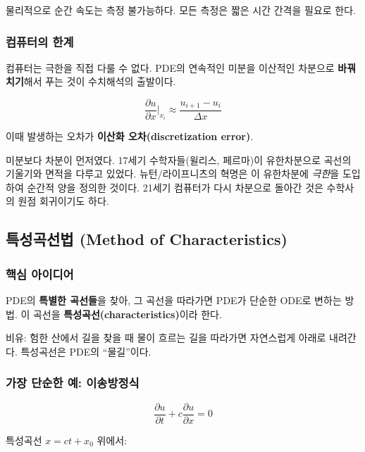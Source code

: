 \documentclass[11pt,a4paper]{article}
\begin{document}
물리적으로 순간 속도는 측정 불가능하다. 모든 측정은 짧은 시간 간격을 필요로 한다.

\subsubsection{컴퓨터의 한계}

컴퓨터는 극한을 직접 다룰 수 없다. PDE의 연속적인 미분을 이산적인 차분으로 \textbf{바꿔치기}해서 푸는 것이 수치해석의 출발이다.

\begin{equation}
\frac{\partial u}{\partial x}\bigg|_{x_i} \approx \frac{u_{i+1} - u_i}{\Delta x}
\end{equation}

이때 발생하는 오차가 \textbf{이산화 오차(discretization error)}.

\begin{historybox}[역사적 사실]
미분보다 차분이 먼저였다. 17세기 수학자들(윌리스, 페르마)이 유한차분으로 곡선의 기울기와 면적을 다루고 있었다. 뉴턴/라이프니츠의 혁명은 이 유한차분에 \emph{극한}을 도입하여 순간적 양을 정의한 것이다. 21세기 컴퓨터가 다시 차분으로 돌아간 것은 수학사의 원점 회귀이기도 하다.
\end{historybox}

\subsection{특성곡선법 (Method of Characteristics)}

\subsubsection{핵심 아이디어}

PDE의 \textbf{특별한 곡선들}을 찾아, 그 곡선을 따라가면 PDE가 단순한 ODE로 변하는 방법. 이 곡선을 \textbf{특성곡선(characteristics)}이라 한다.

비유: 험한 산에서 길을 찾을 때 물이 흐르는 길을 따라가면 자연스럽게 아래로 내려간다. 특성곡선은 PDE의 ``물길''이다.

\subsubsection{가장 단순한 예: 이송방정식}

\begin{equation}
\frac{\partial u}{\partial t} + c \frac{\partial u}{\partial x} = 0
\end{equation}

특성곡선 $x = ct + x_0$ 위에서:
\end{document}
